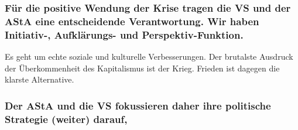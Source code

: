 \documentclass[ngerman,headheight=70pt]{scrartcl}
\begin{document}
    \subsubsection{Für die positive Wendung der Krise tragen die VS und der AStA
    eine entscheidende Verantwortung. Wir haben Initiativ-, Aufklärungs- und
    Perspektiv-Funktion.}

    Es geht um echte soziale und kulturelle Verbesserungen. Der brutalste
    Ausdruck der Überkommenheit des Kapitalismus ist der Krieg. Frieden ist
    dagegen die klarste Alternative.

    \subsubsection{Der AStA und die VS fokussieren daher ihre politische Strategie
    (weiter) darauf,}
\end{document}
